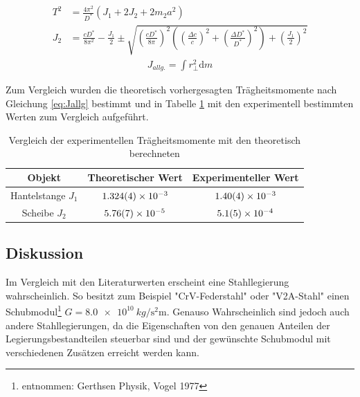 \begin{align}
		T^2&= \frac{4 \pi^2}{D^*}(J_1+2J_2+2m_2 a^2)
	\label{eq:hantelta}\\
J_2&=\frac{c D^*}{8 \pi ^2}-\frac{J_1}{2} \pm \sqrt{\left( \frac{c D^*}{8 \pi}\right) ^2\left( \left( \frac{\Delta c}{c}\right) ^2+  \left( \frac{\Delta D^*}{D^*}\right) ^2\right) + \left(\frac{J_1}{2}\right)^2 }\label{eq:hantelJ2}
\end{align}
\begin{align}
	J_{allg.}=\int r_{\perp}^2 \textrm{d}m
	\label{eq:Jallg}
\end{align}

Zum Vergleich wurden die theoretisch vorhergesagten Trägheitsmomente nach Gleichung \ref{eq:Jallg} bestimmt und in Tabelle \ref{tab:vglJ} mit den experimentell bestimmten Werten zum Vergleich aufgeführt. 

\begin{table}[h!]
	\caption{Vergleich der experimentellen Trägheitsmomente mit den theoretisch berechneten}
	\begin{tabular}{|c|c|c|}
		\hline 
		Objekt &Theoretischer Wert	& Experimenteller Wert  \\ 
		\hline 
		Hantelstange $J_1$ &$\SI{1.324\pm 0.004 e-3}{}$	& $\SI{1.40\pm 0.04e-3}{}$ \\ 
		\hline 
		Scheibe $J_2$&  $\SI{5.76\pm 0.07e-5}{}$	&$\SI{5.1 \pm 0.5  e-04}{}$ \\ 
		\hline 
	\end{tabular} 
	\label{tab:vglJ}
\end{table}








\subsection{Diskussion}
\label{sec:disc:pendel}

Im Vergleich mit den Literaturwerten erscheint eine Stahllegierung wahrscheinlich. So besitzt zum Beispiel "CrV-Federstahl" oder "V2A-Stahl" einen Schubmodul\footnote{entnommen: Gerthsen Physik, Vogel 1977} $G=\SI{8.0 e10}{kg \per  \second \squared \metre}$.
Genauso Wahrscheinlich sind jedoch auch andere Stahllegierungen, da die Eigenschaften von den genauen Anteilen der Legierungsbestandteilen steuerbar sind und der gewünschte Schubmodul mit verschiedenen Zusätzen erreicht werden kann.\\

